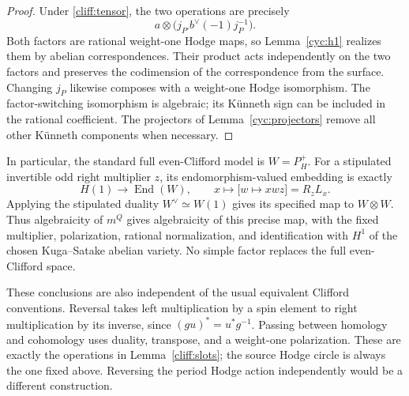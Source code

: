 \begin{proof}
Under \eqref{cliff:tensor}, the two operations are precisely
\begin{equation}\label{cliff:slot-formula}
 a\otimes\bigl(j_{P'}b^\vee(-1)j_P^{-1}\bigr).
\end{equation}
Both factors are rational weight-one Hodge maps, so
Lemma~\ref{cyc:h1} realizes them by abelian correspondences.
Their product acts independently on the two factors and preserves
the codimension of the correspondence from the surface.
Changing $j_P$ likewise composes with a weight-one Hodge
isomorphism. The factor-switching isomorphism is algebraic; its
K\"unneth sign can be included in the rational coefficient.
The projectors of Lemma~\ref{cyc:projectors} remove all other
K\"unneth components when necessary.
\end{proof}

In particular, the standard full even-Clifford model is $W=P_H^+$.
For a stipulated invertible odd right multiplier $z$, its
endomorphism-valued embedding is exactly
\begin{equation}\label{cliff:standard}
 H(1)\longrightarrow\operatorname{End}(W),\qquad
 x\longmapsto\bigl[w\longmapsto xwz\bigr]
       =R_zL_x.
\end{equation}
Applying the stipulated duality $W^\vee\simeq W(1)$ gives its
specified map to $W\otimes W$. Thus algebraicity of $m^Q$ gives
algebraicity of this precise map, with the fixed multiplier,
polarization, rational normalization, and identification with
$H^1$ of the chosen Kuga--Satake abelian variety. No simple factor
replaces the full even-Clifford space.

These conclusions are also independent of the usual equivalent
Clifford conventions. Reversal takes left multiplication by a spin
element to right multiplication by its inverse, since
$(gu)^*=u^*g^{-1}$. Passing between homology and cohomology uses
duality, transpose, and a weight-one polarization. These are exactly
the operations in Lemma~\ref{cliff:slots}; the source Hodge circle
is always the one fixed above. Reversing the period Hodge action
independently would be a different construction.
